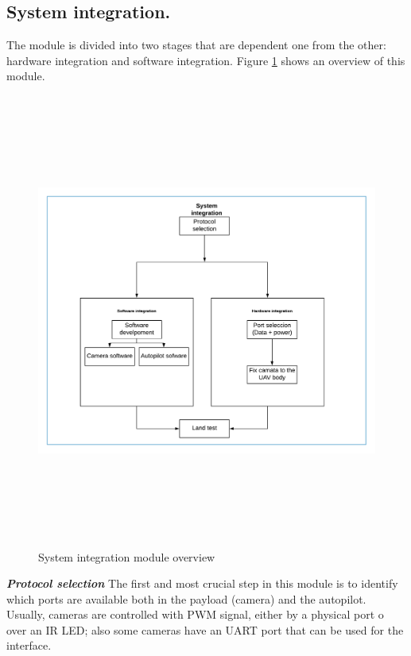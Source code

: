 \subsection{System integration.}
The module is divided into two stages that are dependent one from the other: hardware integration and software integration. Figure \ref{fig:Systemintegration} shows an overview of this module.
\begin{figure}[H]
\centering
\includegraphics[width=15cm,height=15cm,keepaspectratio]{imagenes/Systemintegration.png}
\caption{System integration module overview}
\label{fig:Systemintegration}
\end{figure}
\textit{\textbf{Protocol selection}}\newline
The first and most crucial step in this module is to identify which ports are available both in the payload (camera) and the autopilot. Usually,  cameras are controlled with PWM signal, either by a physical port o over an IR LED; also some cameras have an UART port that can be used for the interface. 

